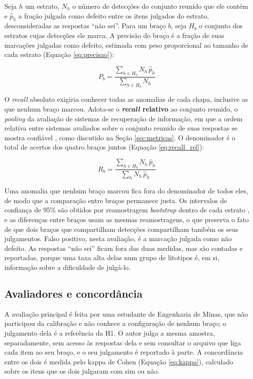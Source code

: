 Seja $h$ um estrato, $N_h$ o número de detecções do conjunto reunido que ele contém e $\hat{p}_h$ a fração julgada como defeito entre os itens julgados do estrato, desconsideradas as respostas ``não sei''. Para um braço $b$, seja $H_b$ o conjunto dos estratos cujas detecções ele marca. A precisão do braço é a fração de suas marcações julgadas como defeito, estimada com peso proporcional ao tamanho de cada estrato (Equação \ref{eq:precisao}):

\begin{equation}
  P_b = \frac{\sum_{h \in H_b} N_h \, \hat{p}_h}{\sum_{h \in H_b} N_h}
  \label{eq:precisao}
\end{equation}

O \textit{recall} absoluto exigiria conhecer todas as anomalias de cada chapa, inclusive as que nenhum braço marcou. Adota-se o \textbf{\textit{recall} relativo} ao conjunto reunido, o \textit{pooling} da avaliação de sistemas de recuperação de informação, em que a ordem relativa entre sistemas avaliados sobre o conjunto reunido de suas respostas se mostra confiável \cite{pooling_zobel1998}, como discutido na Seção \ref{sec:metricas}. O denominador é o total de acertos dos quatro braços juntos (Equação \ref{eq:recall_rel}):

\begin{equation}
  R_b = \frac{\sum_{h \in H_b} N_h \, \hat{p}_h}{\sum_{h} N_h \, \hat{p}_h}
  \label{eq:recall_rel}
\end{equation}

Uma anomalia que nenhum braço marcou fica fora do denominador de todos eles, de modo que a comparação entre braços permanece justa. Os intervalos de confiança de 95\% são obtidos por reamostragem \textit{bootstrap} dentro de cada estrato \cite{bootstrap_efron1979}, e as diferenças entre braços usam as mesmas reamostragens, o que preserva o fato de que dois braços que compartilham detecções compartilham também os seus julgamentos. Falso positivo, nesta avaliação, é a marcação julgada como não defeito. As respostas ``não sei'' ficam fora das duas medidas, mas são contadas e reportadas, porque uma taxa alta delas num grupo de litotipos é, em si, informação sobre a dificuldade de julgá-lo.

\subsection{Avaliadores e concordância}

A avaliação principal é feita por uma estudante de Engenharia de Minas, que não participou da calibração e não conhece a configuração de nenhum braço; o julgamento dela é a referência da H1. O autor julga a mesma amostra, separadamente, sem acesso às respostas dela e sem consultar o arquivo que liga cada item ao seu braço, e o seu julgamento é reportado à parte. A concordância entre os dois é medida pelo kappa de Cohen (Equação \ref{eq:kappa}), calculado sobre os itens que os dois julgaram com sim ou não.

